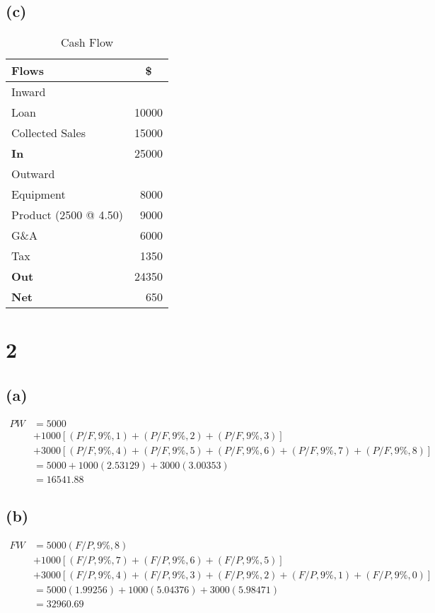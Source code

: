 \documentclass{article}
\newcommand{\ra}[1]{\renewcommand{\arraystretch}{#1}}
\begin{document}
	\subsection*{(c)}

	\begin{center}
	\begin{table*}[ht!]
	\centering
	\ra{1.3}
	\begin{tabular}{@{}lr@{}} \toprule
	Flows & \multicolumn{1}{c}{\$} \\
	\midrule
	Inward & \\ \cmidrule{1-1}
	Loan & 10000\\
	Collected Sales 	& 15000\\  \midrule
	\textbf{In} & 25000\\
	Outward & \\ \cmidrule{1-1}
	Equipment & 8000\\
	Product (2500 @ 4.50) & 9000\\
	G\&A & 6000\\ 
	Tax & 1350\\ \midrule
	\textbf{Out} & 24350\\ 
	\textbf{Net} & 650
	\end{tabular}
	\caption{Cash Flow}
	\end{table*}
	\end{center}
	
	\section*{2}
	\subsection*{(a)}
	\begin{align*}
	PW &= 5000 \\
	&+ 1000 [(P/F, 9\%, 1)+ (P/F, 9\%, 2) + (P/F, 9\%, 3)] \\
	&+ 3000 [(P/F, 9\%, 4) + (P/F, 9\%, 5) + (P/F, 9\%, 6) + (P/F, 9\%, 7) + (P/F, 9\%, 8)] \\
	&= 5000 + 1000 (2.53129) + 3000 (3.00353) \\
	&= 16541.88
	\end{align*}

	\subsection*{(b)}
	\begin{align*}
		FW &= 5000 (F/P, 9\%, 8) \\ 
		&+ 1000 [(F/P, 9\%, 7) + (F/P, 9\%, 6) + (F/P, 9\%, 5)] \\
		&+ 3000 [(F/P, 9\%, 4) + (F/P, 9\%, 3) + (F/P, 9\%, 2) + (F/P, 9\%, 1) + (F/P, 9\%, 0)] \\
		&= 5000 (1.99256) + 1000 (5.04376) + 3000 (5.98471) \\
		&= 32960.69 \\
	\end{align*}
	
\end{document}
